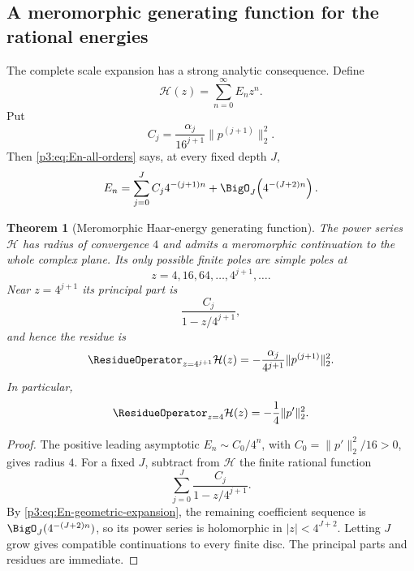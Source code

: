 \documentclass[11pt]{article}
\newtheorem{theorem}{Theorem}[section]
\theoremstyle{definition}
\theoremstyle{remark}
\begin{document}
\subsection{A meromorphic generating function for the rational energies}

The complete scale expansion has a strong analytic consequence.  Define
\begin{equation}\label{p3:eq:H-energy-generating}
 \mathcal H(z)=\sum_{n=0}^\infty E_nz^n.
\end{equation}
Put
\begin{equation}\label{p3:eq:Cj-energy}
 C_j=\frac{\alpha_j}{16^{j+1}}\|p^{(j+1)}\|_2^2.
\end{equation}
Then \eqref{p3:eq:En-all-orders} says, at every fixed depth $J$,
\begin{equation}\label{p3:eq:En-geometric-expansion}
 E_n=\sum_{j=0}^{J}C_j4^{-(j+1)n}
      +\BigO_J\!\left(4^{-(J+2)n}\right).
\end{equation}

\begin{theorem}[Meromorphic Haar-energy generating function]
\label{p3:thm:H-meromorphic}
The power series $\mathcal H$ has radius of convergence $4$ and admits a
meromorphic continuation to the whole complex plane.  Its only possible finite
poles are simple poles at
\begin{equation}\label{p3:eq:H-poles}
 z=4,16,64,\ldots,4^{j+1},\ldots.
\end{equation}
Near $z=4^{j+1}$ its principal part is
\begin{equation}\label{p3:eq:H-principal-part}
 \frac{C_j}{1-z/4^{j+1}},
\end{equation}
and hence the residue is
\begin{equation}\label{p3:eq:H-residue}
 \ResidueOperator_{z=4^{j+1}}\mathcal H(z)
 =-\frac{\alpha_j}{4^{j+1}}\|p^{(j+1)}\|_2^2.
\end{equation}
In particular,
\begin{equation}\label{p3:eq:H-first-residue}
 \ResidueOperator_{z=4}\mathcal H(z)=-\frac1{4}\|p'\|_2^2.
\end{equation}
\end{theorem}

\begin{proof}
The positive leading asymptotic $E_n\sim C_0/4^n$, with
$C_0=\|p'\|_2^2/16>0$, gives radius $4$.  For a fixed $J$, subtract from
$\mathcal H$ the finite rational function
\[
 \sum_{j=0}^{J}\frac{C_j}{1-z/4^{j+1}}.
\]
By \eqref{p3:eq:En-geometric-expansion}, the remaining coefficient sequence is
$\BigO_J(4^{-(J+2)n})$, so its power series is holomorphic in
$|z|<4^{J+2}$.  Letting $J$ grow gives compatible continuations to every finite
disc.  The principal parts and residues are immediate.
\end{proof}
\end{document}
